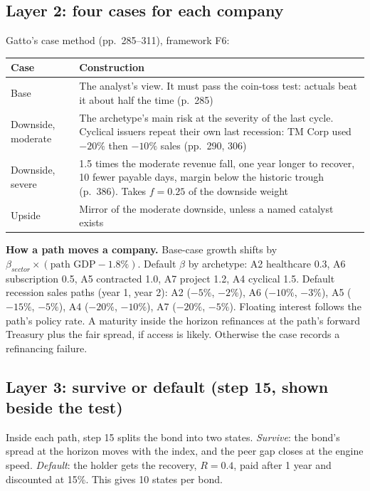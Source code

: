 \documentclass[10pt,a4paper]{article}
\begin{document}
\subsection{Layer 2: four cases for each company}
Gatto's case method (pp.~285--311), framework F6:
\begin{center}
\begin{tabular}{lP{12cm}}
\toprule
Case & Construction \\\midrule
Base & The analyst's view. It must pass the coin-toss test: actuals beat it about half the time (p.~285) \\
Downside, moderate & The archetype's main risk at the severity of the last cycle. Cyclical issuers repeat their own last recession: TM Corp used $-20\%$ then $-10\%$ sales (pp.~290, 306) \\
Downside, severe & 1.5 times the moderate revenue fall, one year longer to recover, 10 fewer payable days, margin below the historic trough (p.~386). Takes $f = 0.25$ of the downside weight \\
Upside & Mirror of the moderate downside, unless a named catalyst exists \\
\bottomrule
\end{tabular}
\end{center}
\textbf{How a path moves a company.} Base-case growth shifts by $\beta_{sector}\times(\text{path GDP} - 1.8\%)$. Default $\beta$ by archetype: A2 healthcare 0.3, A6 subscription 0.5, A5 contracted 1.0, A7 project 1.2, A4 cyclical 1.5. Default recession sales paths (year 1, year 2): A2 ($-5\%$, $-2\%$), A6 ($-10\%$, $-3\%$), A5 ($-15\%$, $-5\%$), A4 ($-20\%$, $-10\%$), A7 ($-20\%$, $-5\%$). Floating interest follows the path's policy rate. A maturity inside the horizon refinances at the path's forward Treasury plus the fair spread, if access is likely. Otherwise the case records a refinancing failure.

\subsection{Layer 3: survive or default (step 15, shown beside the test)}
Inside each path, step 15 splits the bond into two states. \emph{Survive}: the bond's spread at the horizon moves with the index, and the peer gap closes at the engine speed. \emph{Default}: the holder gets the recovery, $R = 0.4$, paid after 1 year and discounted at 15\%. This gives 10 states per bond.
\end{document}
